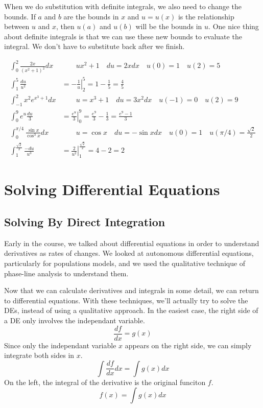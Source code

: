 \documentclass[fleqn]{report}
\begin{document}
When we do substitution with definite integrals, we also need
to change the bounds. If $a$ and $b$ are the bounds in $x$
and $u = u(x)$ is the relationship between $u$ and $x$, then
$u(a)$ and $u(b)$ will be the bounds in $u$. One nice thing
about definite integrals is that we can use these new bounds
to evaluate the integral. We don't have to
substitute back after we finish. 

\begin{example}
\begin{align*}
\int_0^2 \frac{2x}{(x^2+1)^2} dx & \quad \quad u x^2+1 \quad du
= 2xdx \quad u(0) = 1 \quad u(2) = 5 \\
\int_1^5 \frac{du}{u^2} & = \left. -\frac{1}{u} \right|_2^5 =
1 - \frac{1}{5} = \frac{4}{5} \\
\int_{-1}^2 x^2 e^{x^3+1} dx & \quad \quad u = x^3+1 \quad du =
3x^2dx \quad u(-1) = 0 \quad u(2) = 9 \\
\int_0^9 e^u \frac{du}{3} & = \left. \frac{e^u}{3} \right|_0^9 =
\frac{e^9}{3} - \frac{1}{3} = \frac{e^9-1}{3} \\
\int_0^{\pi/4} \frac{\sin x}{\cos^3 x} dx & \quad \quad u = \cos
x \quad du = -\sin x dx \quad u(0) = 1 \quad u(\pi/4) =
\frac{\sqrt{2}}{2} \\
\int_1^{\frac{\sqrt{2}}{2}} \frac{-du}{u^3} & = \left.
\frac{2}{u^2} \right|_1^{\frac{\sqrt{2}}{2}} = 4-2 = 2
\end{align*}
\end{example}

\chapter{Solving Differential Equations}
\label{Solving Differential Equations}

\section*{Solving By Direct Integration}

Early in the course, we talked about differential equations in
order to understand derivatives as rates of changes. We looked
at autonomous differential equations, particularly for
populations models, and we used the qualitative technique of
phase-line analysis to understand them.

Now that we can calculate derivatives and integrals in some
detail, we can return to differential equations. With these
techniques, we'll actually try to solve the DEs, instead of
using a qualitative approach. In the easiest case, the right
side of a DE only involves the independant variable.
\begin{equation*}
\frac{df}{dx} = g(x)
\end{equation*}
Since only the independant variable $x$ appears on the right
side, we can simply integrate both sides in $x$.
\begin{equation*}
\int \frac{df}{dx} dx = \int g(x) dx
\end{equation*}
On the left, the integral of the derivative is the original
funciton $f$.
\begin{equation*}
f(x) = \int g(x) dx
\end{equation*}
\end{document}
